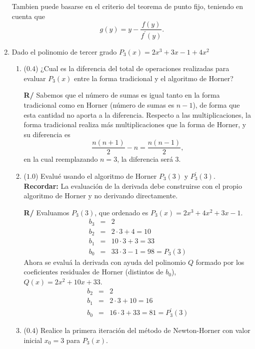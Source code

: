 \documentclass[12pt]{article}
\begin{document}
\begin{enumerate}[leftmargin=*,widest=9]
Tambien puede basarse en el criterio del teorema de punto fijo, teniendo en cuenta que \[ g(y) = y - \frac{f(y)}{f^{\prime}(y)}. \]
    \item Dado el polinomio de tercer grado \(P_3(x) = 2x^3 + 3x - 1 + 4x^2\)
    \begin{enumerate}[label=\alph*]
    \item (\(0.4\)) ¿Cual es la diferencia del total de operaciones realizadas para evaluar \(P_3(x)\) entre la forma tradicional y el algoritmo de Horner?

\textbf{R/} Sabemos que el número de sumas es igual tanto en la forma tradicional como en Horner (número de sumas es \(n-1\)), de forma que esta cantidad no aporta a la diferencia. Respecto a las multiplicaciones, la forma tradicional realiza más multiplicaciones que la forma de Horner, y su diferencia es
   \[ \frac{n(n+1)}{2} - n = \frac{n(n-1)}{2},\]
   en la cual reemplazando \(n= 3\), la diferencia será \(3\).
    \item (\(1.0\)) Evalué usando el algoritmo de Horner \(P_3(3)\) y \(P^\prime_3(3)\). \textbf{Recordar:} La evaluación de la derivada debe construirse con el propio algoritmo de Horner y no derivando directamente.

\textbf{R/} Evaluamos \(P_3(3)\), que ordenado es \(P_3(x) = 2x^3+4x^2+3x-1\).
\begin{eqnarray*}
b_3& = & 2\\
b_2 &= & 2\cdot 3 + 4 = 10\\
b_1 &= & 10 \cdot 3 + 3 = 33\\
b_0 &= & 33 \cdot 3 - 1 = 98 = P_3(3)
\end{eqnarray*}
Ahora se evaluá la derivada con ayuda del polinomio \(Q\) formado por los coeficientes residuales de Horner (distintos de \(b_0\)), \(Q(x) = 2x^2 + 10x +33\).
\begin{eqnarray*}
b_2 &= & 2\\
b_1 & = & 2\cdot 3 + 10 = 16\\
b_0 &= & 16 \cdot 3 + 33 = 81 = P_3^{\prime}(3)
\end{eqnarray*}
   \item (\(0.4\)) Realice la primera iteración del método de Newton-Horner con valor inicial \(x_0=3\) para \(P_3(x)\).


\end{enumerate}
\end{enumerate}
\end{document}
